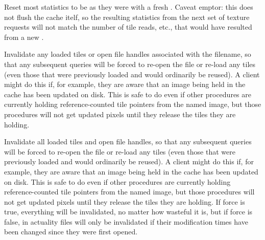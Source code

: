 Reset most statistics to be as they were with a fresh
\ImageCache.  Caveat emptor: this does not flush the cache
itelf, so the resulting statistics from the next set of texture
requests will not match the number of tile reads, etc., that
would have resulted from a new \ImageCache.
\apiend

Invalidate any loaded tiles or open file handles associated with
the filename, so that any subsequent queries will be forced to
re-open the file or re-load any tiles (even those that were
previously loaded and would ordinarily be reused).  A client
might do this if, for example, they are aware that an image
being held in the cache has been updated on disk.  This is safe
to do even if other procedures are currently holding 
reference-counted tile pointers from the named image, but those 
procedures will not get updated pixels until they release the 
tiles they are holding.
\apiend

Invalidate all loaded tiles and open file handles, so that any
subsequent queries will be forced to re-open the file or re-load any
tiles (even those that were previously loaded and would ordinarily be
reused).  A client might do this if, for example, they are aware that an
image being held in the cache has been updated on disk.  This is safe to
do even if other procedures are currently holding reference-counted tile
pointers from the named image, but those procedures will not get updated
pixels until they release the tiles they are holding.  If force is true,
everything will be invalidated, no matter how wasteful it is, but if
force is false, in actuality files will only be invalidated if their
modification times have been changed since they were first opened.
\apiend


\chapwidthend
